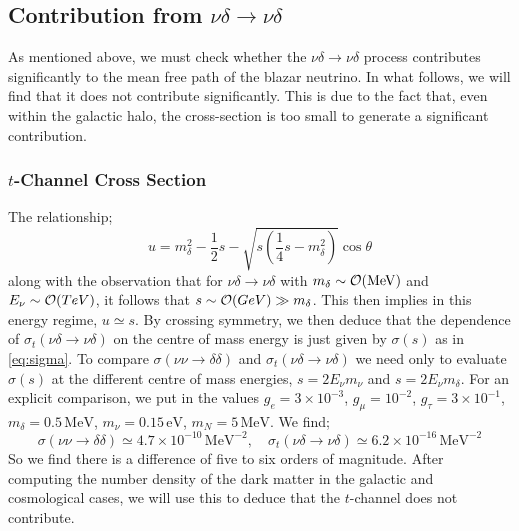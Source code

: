 \subsection{Contribution from $\nu\delta \rightarrow \nu\delta$}
As mentioned above, we must check whether the $\nu\delta \rightarrow \nu\delta$ process contributes significantly to the mean free path of the blazar neutrino. In what follows, we will find that it does not contribute significantly. This is due to the fact that, even within the galactic halo, the cross-section is too small to generate a significant contribution.

\vspace{-0.5cm}

\subsubsection{$t$-Channel Cross Section}\label{sec:tchannel}

The relationship;
\begin{equation}
    u = m_\delta^2 - \frac{1}{2}s - \sqrt{s\left(\frac{1}{4}s - m_\delta^2\right)}\cos\theta
\end{equation}
along with the observation that for $\nu\delta \rightarrow \nu\delta$ with $m_\delta \sim \mathcal{O}(\mathrm{MeV})$ and $E_\nu \sim \mathcal{O}(TeV)$, it follows that $s \sim \mathcal{O}(GeV) \gg m_\delta$. This then implies in this energy regime, $u \simeq s$. By crossing symmetry, we then deduce that the dependence of $\sigma_t(\nu\delta \rightarrow \nu\delta)$ on the centre of mass energy is just given by $\sigma(s)$ as in \eqref{eq:sigma}. To compare $\sigma(\nu\nu \rightarrow \delta \delta)$ and $\sigma_t(\nu\delta \rightarrow \nu\delta)$ we need only to evaluate $\sigma(s)$ at the different centre of mass energies, $s = 2E_\nu m_\nu$ and $s = 2 E_\nu m_\delta$. For an explicit comparison, we put in the values $g_e = 3 \times 10^{-3}$, $g_\mu = 10^{-2}$, $g_\tau = 3\times 10^{-1}$, $m_\delta = 0.5 \, \textrm{MeV}$, $m_\nu = 0.15 \, \textrm{eV}$, $m_N = 5\,\textrm{MeV}$. We find;
\begin{equation}
  \sigma(\nu\nu \rightarrow \delta\delta) \simeq 4.7\times 10^{-10} \, \textrm{MeV}^{-2}, \quad \sigma_t(\nu\delta \rightarrow \nu\delta) \simeq 6.2\times 10^{-16}\, \textrm{MeV}^{-2}
\end{equation}
So we find there is a difference of five to six orders of magnitude. After computing the number density of the dark matter in the galactic and cosmological cases, we will use this to deduce that the $t$-channel does not contribute.

